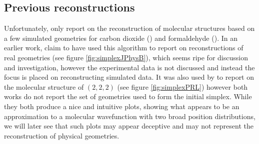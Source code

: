 \subsection{Previous reconstructions}
Unfortunately, \citet{Brichta09} only report on the reconstruction of molecular structures based on a few simulated geometries for carbon dioxide () and formaldehyde (). In an earlier work, \citet{Brichta07} claim to have used this algorithm to report on reconstructions of real  geometries (see figure \ref{fig:simplexJPhysB}), which seems ripe for discussion and investigation, however the experimental data is not discussed and instead the focus is placed on reconstructing simulated data. It was also used by \citet{Bocharova11} to report on the molecular structure of  $(2,2,2)$ (see figure \ref{fig:simplexPRL}) however both works do not report the set of geometries used to form the initial simplex. While they both produce a nice and intuitive plots, showing what appears to be an approximation to a molecular wavefunction with two broad position distributions, we will later see that such plots may appear deceptive and may not represent the reconstruction of physical geometries.

